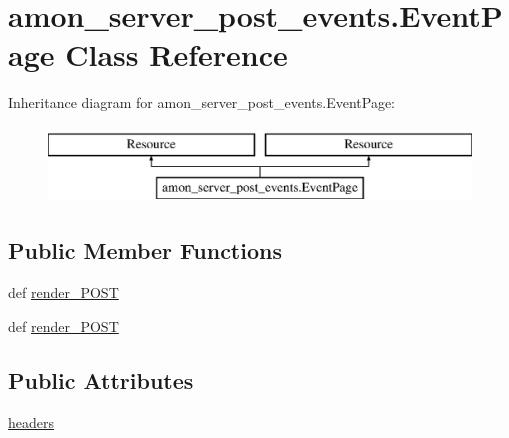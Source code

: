 \hypertarget{classamon__server__post__events_1_1_event_page}{\section{amon\-\_\-server\-\_\-post\-\_\-events.\-Event\-Page Class Reference}
\label{classamon__server__post__events_1_1_event_page}
}
Inheritance diagram for amon\-\_\-server\-\_\-post\-\_\-events.\-Event\-Page\-:\begin{figure}[H]
\begin{center}
\leavevmode
\includegraphics[height=2.000000cm]{dd/df3/classamon__server__post__events_1_1_event_page}
\end{center}
\end{figure}
\subsection*{Public Member Functions}
\begin{DoxyCompactItemize}
\item 
def \hyperlink{classamon__server__post__events_1_1_event_page_a6a13fe43aa7636c1ab259755ef49f12c}{render\-\_\-\-P\-O\-S\-T}
\item 
def \hyperlink{classamon__server__post__events_1_1_event_page_a6a13fe43aa7636c1ab259755ef49f12c}{render\-\_\-\-P\-O\-S\-T}
\end{DoxyCompactItemize}
\subsection*{Public Attributes}
\begin{DoxyCompactItemize}
\item 
\hyperlink{classamon__server__post__events_1_1_event_page_a3162cfad0f10a6d57039b849c2b2c89e}{headers}
\end{DoxyCompactItemize}
